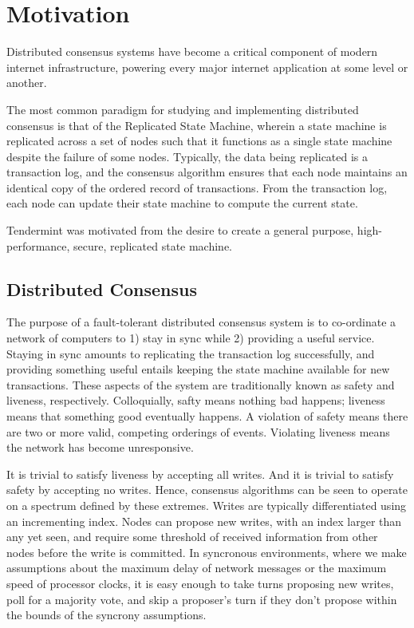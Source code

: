 \chapter{Motivation}

Distributed consensus systems have become a critical component of modern internet infrastructure, powering every major internet application at some level or another.

The most common paradigm for studying and implementing distributed consensus is that of the Replicated State Machine, 
wherein a state machine is replicated across a set of nodes such that it functions as a single state machine despite the failure of some nodes.
Typically, the data being replicated is a transaction log, and the consensus algorithm ensures that each node maintains an identical copy of 
the ordered record of transactions.
From the transaction log, each node can update their state machine to compute the current state.

Tendermint was motivated from the desire to create a general purpose, high-performance, secure, replicated state machine.


\section{Distributed Consensus}

The purpose of a fault-tolerant distributed consensus system is to co-ordinate a network of computers to 1) stay in sync while 2) providing a useful service.
Staying in sync amounts to replicating the transaction log successfully, and providing something useful entails keeping the state machine available for new transactions.
These aspects of the system are traditionally known as safety and liveness, respectively.
Colloquially, safty means nothing bad happens; liveness means that something good eventually happens.
A violation of safety means there are two or more valid, competing orderings of events.
Violating liveness means the network has become unresponsive.

It is trivial to satisfy liveness by accepting all writes. And it is trivial to satisfy safety by accepting no writes.
Hence, consensus algorithms can be seen to operate on a spectrum defined by these extremes.
Writes are typically differentiated using an incrementing index.
Nodes can propose new writes, with an index larger than any yet seen,
and require some threshold of received information from other nodes before the write is committed.
In syncronous environments, where we make assumptions about the maximum delay of network messages or the maximum speed of processor clocks,
 it is easy enough to take turns proposing new writes, poll for a majority vote, 
and skip a proposer's turn if they don't propose within the bounds of the syncrony assumptions.

